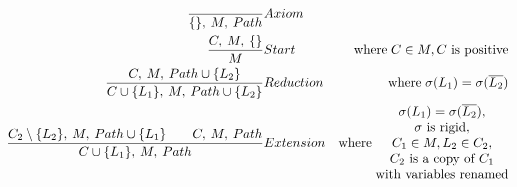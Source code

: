 \begin{eqnarray*}
  \frac{}{\{\},\:M,\:Path} & Axiom & \\
  \frac{C,\:M,\:\{\}}{M} & Start & \mathrm{ where \;} C \in M, C\textrm{ is positive}\\
  \frac{C,\:M,\:Path\cup\{L_{2}\}}{C\cup\{L_{1}\},\:M,\:Path\cup\{L_{2}\}} & Reduction & \mathrm{ where \;} \sigma(L_{1})=\sigma(\overline{L_{2}}) \\
  \frac{C_2\setminus\{L_{2}\},\:M,\:Path\cup\{L_{1}\}\qquad C,\:M,\:Path}{C\cup\{L_{1}\},\:M,\:Path} & Extension & \mathrm { where \;}
  \begin{array}{@{}c@{}}
    \sigma(L_{1})=\sigma(\overline{L_{2}}),\\
    \sigma \textrm{ is rigid},\\
    C_1 \in M, L_2 \in C_2,\\
    C_2 \textrm{ is a copy of } C_1\\
    \textrm{with variables renamed}
  \end{array}
\end{eqnarray*}
